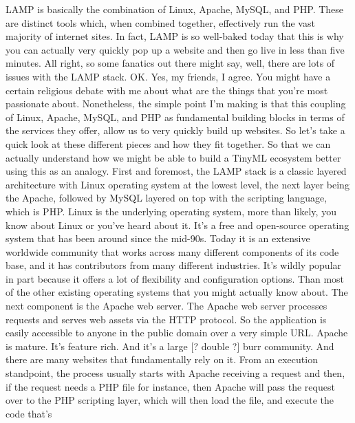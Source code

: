 {{{{{     LAMP is basically the combination of Linux, Apache, MySQL, and PHP.
     These are distinct tools which, when combined together,
     effectively run the vast majority of internet sites.
     In fact, LAMP is so well-baked today that this
     is why you can actually very quickly pop up a website
     and then go live in less than five minutes.
     All right, so some fanatics out there might say,
     well, there are lots of issues with the LAMP stack.
     OK.
     Yes, my friends, I agree.
     You might have a certain religious debate with me
     about what are the things that you're most passionate about.
     Nonetheless, the simple point I'm making is
     that this coupling of Linux, Apache, MySQL, and PHP
     as fundamental building blocks in terms of the services they offer,
     allow us to very quickly build up websites.
     So let's take a quick look at these different pieces
     and how they fit together.
     So that we can actually understand how we
     might be able to build a TinyML ecosystem better
     using this as an analogy.
     First and foremost, the LAMP stack is a classic layered architecture
     with Linux operating system at the lowest level,
     the next layer being the Apache, followed by MySQL
     layered on top with the scripting language, which is PHP.
     Linux is the underlying operating system, more than likely,
     you know about Linux or you've heard about it.
     It's a free and open-source operating system
     that has been around since the mid-90s.
     Today it is an extensive worldwide community
     that works across many different components of its code base,
     and it has contributors from many different industries.
     It's wildly popular in part because it offers a lot of flexibility
     and configuration options.
     Than most of the other existing operating systems
     that you might actually know about.
     The next component is the Apache web server.
     The Apache web server processes requests and serves
     web assets via the HTTP protocol.
     So the application is easily accessible to anyone in the public domain
     over a very simple URL.
     Apache is mature.
     It's feature rich.
     And it's a large [? double ?] burr community.
     And there are many websites that fundamentally rely on it.
     From an execution standpoint, the process usually
     starts with Apache receiving a request and then,
     if the request needs a PHP file for instance,
     then Apache will pass the request over to the PHP scripting layer, which
     will then load the file, and execute the code that's
}}}}}
